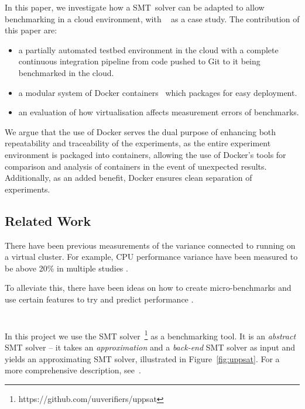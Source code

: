 \documentclass[a4paper]{IEEEtran}
\begin{document}
In this paper, we investigate how a SMT~solver can be adapted to allow
benchmarking in a cloud environment, with \uppsat{}~\cite{uppsat} as a
case study. The contribution of this paper are:

\begin{itemize}
  \item a partially automated testbed environment in the cloud with a
    complete continuous integration pipeline from code pushed to Git
    to it being benchmarked in the cloud.
    
  \item a modular system of Docker containers~\cite{docker} which
    packages \uppsat{} for easy deployment.

  \item an evaluation of how virtualisation affects measurement errors
    of benchmarks.
\end{itemize}

We argue that the use of Docker serves the dual purpose of enhancing both
repeatability and traceability of the experiments, as the entire experiment
environment is packaged into containers, allowing the use of Docker's tools for
comparison and analysis of containers in the event of unexpected results.
Additionally, as an added benefit, Docker ensures clean separation of
experiments.

\subsection{Related Work}
There have been previous measurements of the variance connected to
running on a virtual cluster. For example, CPU performance variance
have been measured to be above 20\% in multiple studies
\cite{measurementCloud, sameCloud}.

To alleviate this, there have been ideas on how to create
micro-benchmarks and use certain features to try and predict
performance \cite{estimatingCloud}.

\section{\uppsat{}}
In this project we use the \uppsat{} SMT
solver~\footnote{https://github.com/uuverifiers/uppsat} as a
benchmarking tool. It is an \emph{abstract} SMT solver -- it takes an
\emph{approximation} and a \emph{back-end} SMT solver as input and
yields an approximating SMT solver, illustrated in
Figure~\ref{fig:uppsat}. For a more comprehensive description,
see~\cite{uppsat}.
\end{document}
